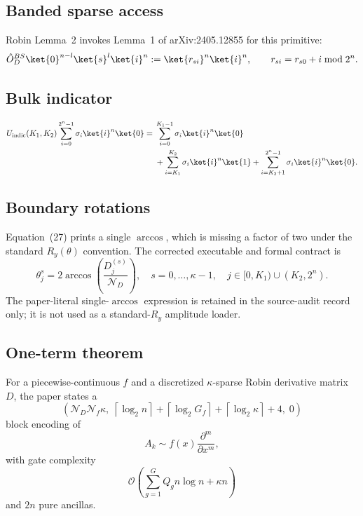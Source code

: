 
\subsection*{Banded sparse access}
Robin Lemma~2 invokes Lemma~1 of arXiv:2405.12855 for this primitive:
\[
\hat{O}^{BS}_D\ket{0}^{n-l}\ket{s}^l\ket{i}^n
  := \ket{r_{si}}^n\ket{i}^n,
\qquad
r_{si}=r_{s0}+i \bmod 2^n.
\]

\subsection*{Bulk indicator}
\[
\begin{aligned}
U_{\mathrm{indic}}(K_1,K_2)
  \sum_{i=0}^{2^n-1}\sigma_i\ket{i}^n\ket{0}
={}&
\sum_{i=0}^{K_1-1}\sigma_i\ket{i}^n\ket{0}\\
&+\sum_{i=K_1}^{K_2}\sigma_i\ket{i}^n\ket{1}
+\sum_{i=K_2+1}^{2^n-1}\sigma_i\ket{i}^n\ket{0}.
\end{aligned}
\]

\subsection*{Boundary rotations}
Equation~(27) prints a single \(\arccos\), which is missing a factor of two
under the standard \(R_y(\theta)\) convention.  The corrected executable and
formal contract is
\[
\theta_j^s =
2\arccos\left(\frac{D_j^{(s)}}{\mathcal{N}_D}\right),
\quad
s=0,\ldots,\kappa-1,
\quad
j\in[0,K_1)\cup(K_2,2^n).
\]
The paper-literal single-\(\arccos\) expression is retained in the source-audit
record only; it is not used as a standard-\(R_y\) amplitude loader.

\subsection*{One-term theorem}
For a piecewise-continuous \(f\) and a discretized \(\kappa\)-sparse Robin
derivative matrix \(D\), the paper states a
\[
\left(
  \mathcal{N}_D\mathcal{N}_f\kappa,\;
  \left\lceil\log_2 n\right\rceil+
  \left\lceil\log_2 G_f\right\rceil+
  \left\lceil\log_2\kappa\right\rceil+4,\;
  0
\right)
\]
block encoding of
\[
A_k\sim f(x)\frac{\partial^m}{\partial x^m},
\]
with gate complexity
\[
\mathcal{O}\left(\sum_{g=1}^{G}Q_g n\log n+\kappa n\right)
\]
and \(2n\) pure ancillas.

